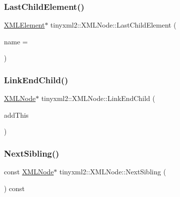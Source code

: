 \subsubsection{\texorpdfstring{Last\+Child\+Element()}{LastChildElement()}\hspace{0.1cm}{\footnotesize\ttfamily [2/2]}}
{\footnotesize\ttfamily \mbox{\hyperlink{classtinyxml2_1_1_x_m_l_element}{X\+M\+L\+Element}}$\ast$ tinyxml2\+::\+X\+M\+L\+Node\+::\+Last\+Child\+Element (\begin{DoxyParamCaption}\item[{const char $\ast$}]{name = {} }\end{DoxyParamCaption})\hspace{0.3cm}{\ttfamily [inline]}}

\mbox{\label{classtinyxml2_1_1_x_m_l_node_a663e3a5a378169fd477378f4d17a7649}} 
\subsubsection{\texorpdfstring{Link\+End\+Child()}{LinkEndChild()}}
{\footnotesize\ttfamily \mbox{\hyperlink{classtinyxml2_1_1_x_m_l_node}{X\+M\+L\+Node}}$\ast$ tinyxml2\+::\+X\+M\+L\+Node\+::\+Link\+End\+Child (\begin{DoxyParamCaption}\item[{\mbox{\hyperlink{classtinyxml2_1_1_x_m_l_node}{X\+M\+L\+Node}} $\ast$}]{add\+This }\end{DoxyParamCaption})\hspace{0.3cm}{\ttfamily [inline]}}

\mbox{\label{classtinyxml2_1_1_x_m_l_node_a79db9ef0fe014d27790f2218b87bcbb5}} 
\subsubsection{\texorpdfstring{Next\+Sibling()}{NextSibling()}\hspace{0.1cm}{\footnotesize\ttfamily [1/2]}}
{\footnotesize\ttfamily const \mbox{\hyperlink{classtinyxml2_1_1_x_m_l_node}{X\+M\+L\+Node}}$\ast$ tinyxml2\+::\+X\+M\+L\+Node\+::\+Next\+Sibling (\begin{DoxyParamCaption}{ }\end{DoxyParamCaption}) const\hspace{0.3cm}{\ttfamily [inline]}}



